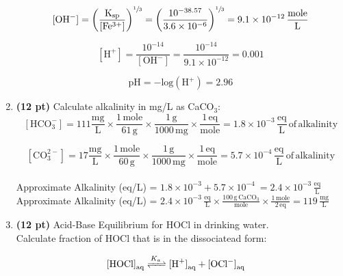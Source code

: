 \documentclass[12pt,letterpaper]{article}
\begin{document}
\begin{enumerate}
\begin{equation*}
\mathrm{[OH^-] = \bigg(\frac{K_{sp}}{[Fe^{3+}]}\bigg)^{\sfrac{1}{3}} = \bigg(\frac{10^{-38.57}}{3.6\times 10^{-6}}\bigg)^{\sfrac{1}{3}} = 9.1\times 10^{-12}\, \frac{mole}{L}} 
\end{equation*}

\begin{equation*}
\mathrm{[H^+] = \frac{10^{-14}}{[OH^-]} = \frac{10^{-14}}{9.1\times 10^{-12}} = 0.001}
\end{equation*}

\begin{equation*}
\mathrm{pH = -log(H^+) = 2.96}
\end{equation*}

\vspace{0.2in}

\item \textbf{(12 pt)} Calculate alkalinity in mg/L as CaCO$_3$:\\

\begin{equation*}
\mathrm{[HCO_3^{-}] = 111 \frac{mg}{L}\times \frac{1\, mole}{61\, g}\times \frac{1\, g}{1000\, mg}\times \frac{1\, eq}{mole} = 1.8\times 10^{-3}\, \frac{eq}{L}\, of \, alkalinity}
\end{equation*}

\begin{equation*}
\mathrm{[CO_3^{2-}] = 17 \frac{mg}{L}\times \frac{1\, mole}{60\, g}\times \frac{1\, g}{1000\, mg}\times \frac{1\, eq}{mole} = 5.7\times 10^{-4}\, \frac{eq}{L}\, of \, alkalinity}
\end{equation*}\\

Approximate Alkalinity (eq/L) = $\mathrm{1.8\times 10^{-3} + 5.7\times 10^{-4}\ = 2.4\times 10^{-3}\, \frac{eq}{L}}$\\

Approximate Alkalinity (eq/L) = $\mathrm{2.4\times 10^{-3}\, \frac{eq}{L} \times \frac{100\, g\, CaCO_3}{mole}\times \frac{1\, mole}{2\, eq} = 119\, \frac{mg}{L}}$\\

\vspace{0.2in}

\item \textbf{(12 pt)} Acid-Base Equilibrium for HOCl in drinking water.\\
Calculate fraction of HOCl that is in the dissociatead form:

\begin{align*}
\cee{[HOCl]_{aq} &<=>[K_{a}] [H^{+}]_{aq} + [OCl^{-}]_{aq}} 
\end{align*}\\


\end{enumerate}
\end{document}
